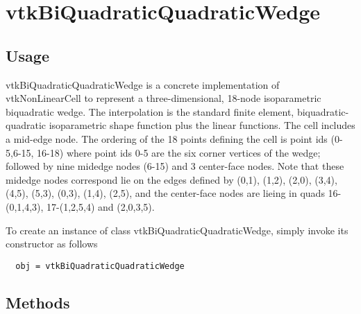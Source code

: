\section{vtkBiQuadraticQuadraticWedge}

\subsection{Usage}

 vtkBiQuadraticQuadraticWedge is a concrete implementation of vtkNonLinearCell to
 represent a three-dimensional, 18-node isoparametric biquadratic
 wedge. The interpolation is the standard finite element,
 biquadratic-quadratic isoparametric shape function plus the linear functions.
 The cell includes a mid-edge node. The
 ordering of the 18 points defining the cell is point ids (0-5,6-15, 16-18)
 where point ids 0-5 are the six corner vertices of the wedge; followed by
 nine midedge nodes (6-15) and 3 center-face nodes. Note that these midedge
 nodes correspond lie
 on the edges defined by (0,1), (1,2), (2,0), (3,4), (4,5), (5,3), (0,3),
 (1,4), (2,5), and the center-face nodes are lieing in quads 16-(0,1,4,3),
 17-(1,2,5,4) and (2,0,3,5).


To create an instance of class vtkBiQuadraticQuadraticWedge, simply
invoke its constructor as follows
\begin{verbatim}
  obj = vtkBiQuadraticQuadraticWedge
\end{verbatim}
\subsection{Methods}

